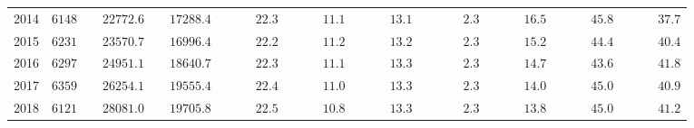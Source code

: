 \documentclass[a4paper,12pt,twoside]{book}
\begin{document}
\begin{table}[ht]
{\begin{tabular}{lcccccccccc}
	2014  & $6148$ & $\phantom{00}22772.6$ & $\phantom{00}17288.4$ & $\phantom{00000}22.3$ & $\phantom{00000}11.1$ & $\phantom{00000}13.1$ & $\phantom{000000}2.3$ & $\phantom{00000}16.5$ & $\phantom{00000}45.8$ & $\phantom{00000}37.7$ \\
	2015  & $6231$ & $\phantom{00}23570.7$ & $\phantom{00}16996.4$ & $\phantom{00000}22.2$ & $\phantom{00000}11.2$ & $\phantom{00000}13.2$ & $\phantom{000000}2.3$ & $\phantom{00000}15.2$ & $\phantom{00000}44.4$ & $\phantom{00000}40.4$ \\
	2016  & $6297$ & $\phantom{00}24951.1$ & $\phantom{00}18640.7$ & $\phantom{00000}22.3$ & $\phantom{00000}11.1$ & $\phantom{00000}13.3$ & $\phantom{000000}2.3$ & $\phantom{00000}14.7$ & $\phantom{00000}43.6$ & $\phantom{00000}41.8$ \\
	2017  & $6359$ & $\phantom{00}26254.1$ & $\phantom{00}19555.4$ & $\phantom{00000}22.4$ & $\phantom{00000}11.0$ & $\phantom{00000}13.3$ & $\phantom{000000}2.3$ & $\phantom{00000}14.0$ & $\phantom{00000}45.0$ & $\phantom{00000}40.9$ \\
	2018  & $6121$ & $\phantom{00}28081.0$ & $\phantom{00}19705.8$ & $\phantom{00000}22.5$ & $\phantom{00000}10.8$ & $\phantom{00000}13.3$ & $\phantom{000000}2.3$ & $\phantom{00000}13.8$ & $\phantom{00000}45.0$ & $\phantom{00000}41.2$ \\
	\hline 
\end{tabular}
}
\end{table}
\end{document}
